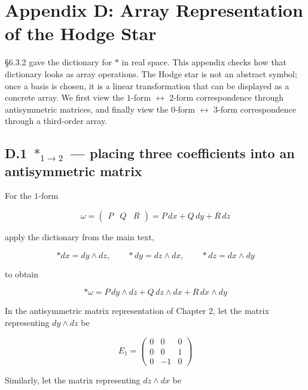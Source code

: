 \documentclass[a4paper,12pt,openany]{book}
\begin{document}
\hypertarget{appendix-d-array-representation-of-the-hodge-star}{%
\section{Appendix D: Array Representation of the Hodge
Star}\label{appendix-d-array-representation-of-the-hodge-star}}

§6.3.2 gave the dictionary for \(\ast\) in real space. This appendix
checks how that dictionary looks as array operations. The Hodge star is
not an abstract symbol; once a basis is chosen, it is a linear
transformation that can be displayed as a concrete array. We first view
the \(1\)-form \(\leftrightarrow\) \(2\)-form correspondence through
antisymmetric matrices, and finally view the \(0\)-form
\(\leftrightarrow\) \(3\)-form correspondence through a third-order
array.

\hypertarget{d.1-ast_1to2-placing-three-coefficients-into-an-antisymmetric-matrix}{%
\subsection*{\texorpdfstring{D.1 \(\ast_{1\to2}\) — placing three
coefficients into an antisymmetric
matrix}{D.1 \textbackslash ast\_\{1\textbackslash to2\} — placing three coefficients into an antisymmetric matrix}}\label{d.1-ast_1to2-placing-three-coefficients-into-an-antisymmetric-matrix}}

For the \(1\)-form

\[
\omega =
\begin{pmatrix}P & Q & R\end{pmatrix}
=
P\,dx + Q\,dy + R\,dz
\]

apply the dictionary from the main text,

\[
\ast dx = dy \wedge dz,\qquad
\ast dy = dz \wedge dx,\qquad
\ast dz = dx \wedge dy
\]

to obtain

\[
\ast\omega
=
P\,dy\wedge dz
+
Q\,dz\wedge dx
+
R\,dx\wedge dy
\]

In the antisymmetric matrix representation of Chapter 2, let the matrix
representing \(dy\wedge dz\) be

\[
E_1 =
\begin{pmatrix}
0 & 0 & 0 \\
0 & 0 & 1 \\
0 & -1 & 0
\end{pmatrix}
\]

Similarly, let the matrix representing \(dz\wedge dx\) be
\end{document}
